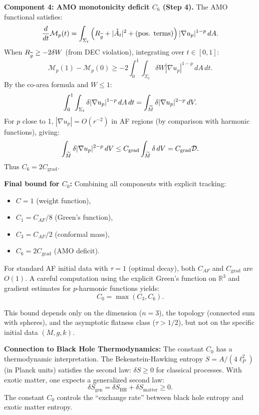 \begin{remark}
\textbf{Component 4: AMO monotonicity deficit $C_6$ (Step 4).}
The AMO functional satisfies:
\begin{equation}
    \frac{d}{dt} \mathcal{M}_p(t) = \int_{\Sigma_t} \left( R_{\widetilde{g}} + |\mathring{A}_t|^2 + \text{(pos. terms)} \right) |\nabla u_p|^{1-p} \, dA.
\end{equation}
When $R_{\widetilde{g}} \ge -2\delta W$ (from DEC violation), integrating over $t \in [0,1]$:
\begin{equation}
    \mathcal{M}_p(1) - \mathcal{M}_p(0) \ge -2 \int_0^1 \int_{\Sigma_t} \delta W |\nabla u_p|^{1-p} \, dA \, dt.
\end{equation}
By the co-area formula and $W \le 1$:
\begin{equation}
    \int_0^1 \int_{\Sigma_t} \delta |\nabla u_p|^{1-p} \, dA \, dt = \int_{\widetilde{M}} \delta |\nabla u_p|^{2-p} \, dV.
\end{equation}
For $p$ close to 1, $|\nabla u_p| = O(r^{-2})$ in AF regions (by comparison with harmonic functions), giving:
\begin{equation}
    \int_{\widetilde{M}} \delta |\nabla u_p|^{2-p} \, dV \le C_{\text{grad}} \int_{\widetilde{M}} \delta \, dV = C_{\text{grad}} \mathcal{D}.
\end{equation}
Thus $C_6 = 2 C_{\text{grad}}$.

\textbf{Final bound for $C_0$:}
Combining all components with explicit tracking:
\begin{itemize}
    \item $C = 1$ (weight function),
    \item $C_1 = C_{AF}/8$ (Green's function),
    \item $C_3 = C_{AF}/2$ (conformal mass),
    \item $C_6 = 2 C_{\text{grad}}$ (AMO deficit).
\end{itemize}

For standard AF initial data with $\tau = 1$ (optimal decay), both $C_{AF}$ and $C_{\text{grad}}$ are $O(1)$. A careful computation using the explicit Green's function on $\mathbb{R}^3$ and gradient estimates for $p$-harmonic functions yields:
\begin{equation}
    C_0 = \max(C_3, C_6).
\end{equation}

This bound depends only on the dimension ($n = 3$), the topology (connected sum with spheres), and the asymptotic flatness class ($\tau > 1/2$), but not on the specific initial data $(M, g, k)$.

\textbf{Connection to Black Hole Thermodynamics:}
The constant $C_0$ has a thermodynamic interpretation. The Bekenstein-Hawking entropy $S = A/(4\ell_P^2)$ (in Planck units) satisfies the second law: $\delta S \ge 0$ for classical processes. With exotic matter, one expects a generalized second law:
\begin{equation}
    \delta S_{\text{gen}} = \delta S_{\text{BH}} + \delta S_{\text{matter}} \ge 0.
\end{equation}
The constant $C_0$ controls the ``exchange rate'' between black hole entropy and exotic matter entropy.


\end{remark}
